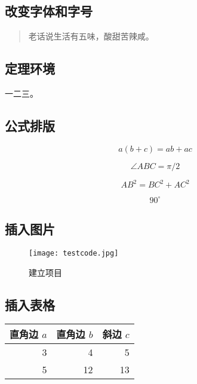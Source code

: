 \subsection{改变字体和字号}
\begin{quote}
 \kaishu 老话说生活有五味，酸甜苦辣咸。
\end{quote}

\subsection{定理环境}
\begin{thm}[勾股定理]
一二三。
\end{thm}

\subsection{公式排版}
\begin{equation}
a(b+c) = ab + ac
\end{equation}

\begin{equation}
\angle ABC = \pi / 2
\end{equation}

\begin{equation}\label{eq:gougu}
AB^2 = BC^2 + AC^2
\end{equation}

\begin{equation}
90^\circ
\end{equation}

\subsection{插入图片}
\begin{figure}[H]
\centering
\texttt{[image: testcode.jpg]}
\caption{建立项目}
\label{fig:createproject}
\end{figure}

\subsection{插入表格}
\begin{table}[H] %
\begin{tabular}{|rrr|}
\hline
直角边 $a$ & 直角边 $b$ & 斜边 $c$ \\
\hline
3 & 4 & 5 \\  %
5 & 12 & 13 \\ %
\hline
\end{tabular}
\end{table}

